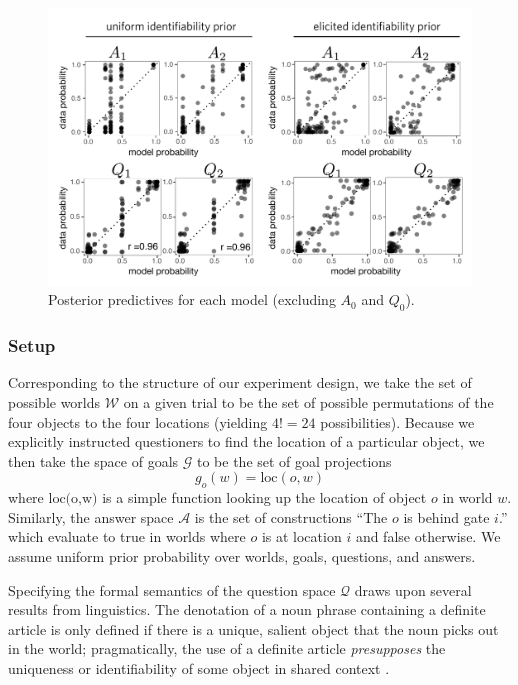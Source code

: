 \documentclass[11pt, floatsintext]{apa6}
\begin{document}
\begin{figure}[tbh!]
\begin{center}
\includegraphics[scale = .77]{Exp1/ResultsFig.pdf}
\end{center}
\caption{Posterior predictives for each model (excluding $A_0$ and $Q_0$). }
\label{fig:exp1predictives}
\end{figure}


\subsubsection{Setup} 
Corresponding to the structure of our experiment design, we take the set of possible worlds $\mathcal{W}$ on a given trial to be the set of possible permutations of the four objects to the four locations (yielding $4! = 24$ possibilities). 
Because we explicitly instructed questioners to find the location of a particular object, we then take the space of goals $\mathcal{G}$ to be the set of goal projections $$g_o(w) = \textrm{loc}(o,w)$$ where $\textrm{loc(o,w)}$ is a simple function looking up the location of object $o$ in world $w$. 
Similarly, the answer space $\mathcal{A}$ is the set of constructions ``The $o$ is behind gate $i$.'' which evaluate to true in worlds where $o$ is at location $i$ and false otherwise.
We assume uniform prior probability over worlds, goals, questions, and answers. 

Specifying the formal semantics of the question space $\mathcal{Q}$ draws upon several results from linguistics. 
The denotation of a noun phrase containing a definite article is only defined if there is a unique, salient object that the noun picks out in the world; pragmatically, the use of a definite article \emph{presupposes} the uniqueness or identifiability of some object in shared context \cite{Lewis79_Scorekeeping, clark1983common, Roberts03_UniquenessDefiniteNounPhrases}. 
\end{document}
